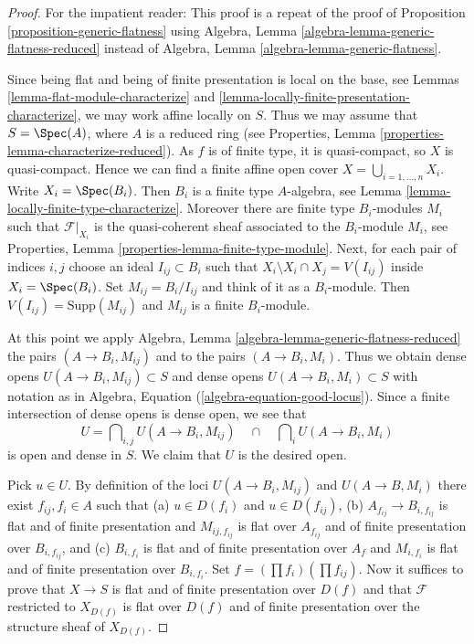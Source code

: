 \begin{proof}
For the impatient reader: This proof is a repeat of the proof of
Proposition \ref{proposition-generic-flatness}
using
Algebra, Lemma \ref{algebra-lemma-generic-flatness-reduced}
instead of
Algebra, Lemma \ref{algebra-lemma-generic-flatness}.

\medskip\noindent
Since being flat and being of finite presentation is local on the
base, see
Lemmas \ref{lemma-flat-module-characterize} and
\ref{lemma-locally-finite-presentation-characterize},
we may work affine locally on $S$. Thus we may assume that
$S = \Spec(A)$, where $A$ is a reduced ring (see
Properties, Lemma \ref{properties-lemma-characterize-reduced}).
As $f$ is of finite type, it is quasi-compact, so $X$ is quasi-compact.
Hence we can find a finite affine open cover
$X = \bigcup_{i = 1, \ldots, n} X_i$. Write $X_i = \Spec(B_i)$.
Then $B_i$ is a finite type $A$-algebra, see
Lemma \ref{lemma-locally-finite-type-characterize}.
Moreover there are finite type
$B_i$-modules $M_i$ such that $\mathcal{F}|_{X_i}$ is the
quasi-coherent sheaf associated to the $B_i$-module $M_i$, see
Properties, Lemma \ref{properties-lemma-finite-type-module}.
Next, for each pair of indices $i, j$ choose an ideal $I_{ij} \subset B_i$
such that $X_i \setminus X_i \cap X_j = V(I_{ij})$ inside
$X_i = \Spec(B_i)$. Set $M_{ij} = B_i/I_{ij}$ and think
of it as a $B_i$-module. Then $V(I_{ij}) = \text{Supp}(M_{ij})$
and $M_{ij}$ is a finite $B_i$-module.

\medskip\noindent
At this point we apply
Algebra, Lemma \ref{algebra-lemma-generic-flatness-reduced}
the pairs $(A \to B_i, M_{ij})$ and to the pairs $(A \to B_i, M_i)$.
Thus we obtain dense opens
$U(A \to B_i, M_{ij}) \subset S$ and dense opens
$U(A \to B_i, M_i) \subset S$ with notation as in
Algebra, Equation (\ref{algebra-equation-good-locus}).
Since a finite intersection of dense opens is dense open, we see that
$$
U =
\bigcap\nolimits_{i, j} U(A \to B_i, M_{ij})
\quad\cap\quad
\bigcap\nolimits_i U(A \to B_i, M_i)
$$
is open and dense in $S$. We claim that $U$ is the desired open.

\medskip\noindent
Pick $u \in U$. By definition of the loci $U(A \to B_i, M_{ij})$
and $U(A \to B, M_i)$ there exist $f_{ij}, f_i \in A$ such that
(a) $u \in D(f_i)$ and $u \in D(f_{ij})$,
(b) $A_{f_{ij}} \to B_{i, f_{ij}}$ is flat and of finite presentation
and $M_{ij, f_{ij}}$ is flat over $A_{f_{ij}}$ and of finite presentation
over $B_{i, f_{ij}}$, and
(c) $B_{i, f_i}$ is flat and of finite presentation over $A_f$ and
$M_{i, f_i}$ is flat and of finite presentation over $B_{i, f_i}$. Set
$f = (\prod f_i) (\prod f_{ij})$.
Now it suffices to prove that $X \to S$ is flat and of finite presentation
over $D(f)$ and that $\mathcal{F}$ restricted to $X_{D(f)}$ is
flat over $D(f)$ and of finite presentation over the structure sheaf
of $X_{D(f)}$.


\end{proof}
